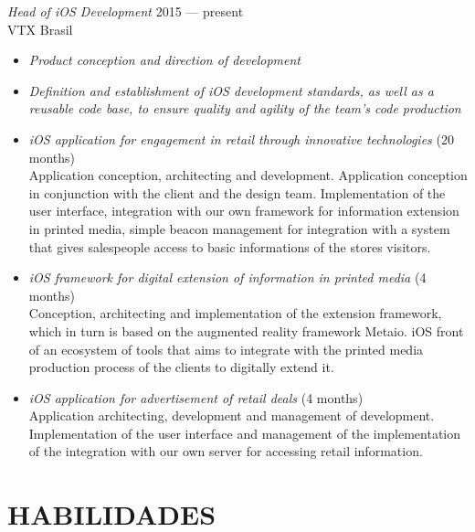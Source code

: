 \documentclass[]{res} %
\newcommand{\sbt}{\,\begin{picture}(-1,1)(-2,-3)\circle*{2}\end{picture}\ }
\def \divspace{6pt}
\def \myitemback{0.55cm}
\def \myitemsep{0pt}
\def \mypositionface{\sl}
\def \myorgface{\sc}
\newif\ifport
\newif\ifgames
\begin{document}
\begin{resume}
    {\mypositionface Head of iOS Development} \hfill 2015 — present\\
    {\myorgface VTX Brasil}

    \begin{itemize}[itemsep=\myitemsep,leftmargin=\myitemback]
    \item[\sbt] {\it Product conception and direction of development}
    \item[\sbt] {\it Definition and establishment of iOS development standards, as well as a reusable code base, to ensure quality and agility of the team's code production}

    \ifgames
        \vfill
    \else
    \fi

    \item[\sbt] {\it iOS application for engagement in retail through innovative technologies} \hfill (20 months)\\
    Application conception, architecting and development. Application conception in conjunction with the client and the design team. Implementation of the user interface, integration with our own framework for information extension in printed media, simple beacon management for integration with a system that gives salespeople access to basic informations of the stores visitors.
    \item[\sbt] {\it iOS framework for digital extension of information in printed media} \hfill (4 months)\\
    Conception, architecting and implementation of the extension framework, which in turn is based on the augmented reality framework Metaio. iOS front of an ecosystem of tools that aims to integrate with the printed media production process of the clients to digitally extend it.
    
    \ifgames
    \else
        \vfill
    \fi

    \item[\sbt] {\it iOS application for advertisement of retail deals} \hfill (4 months)\\
    Application architecting, development and management of development. Implementation of the user interface and management of the implementation of the integration with our own server for accessing retail information.
    \end{itemize}
\fi
\ifport
    \section{HABILIDADES \hspace{\divspace} }


\end{resume}
\end{document}
